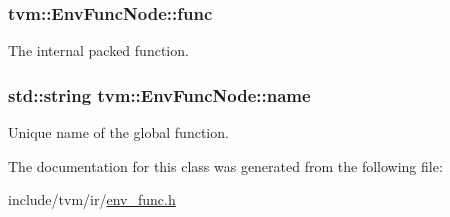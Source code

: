 \subsubsection[{\texorpdfstring{func}{func}}]{ tvm\+::\+Env\+Func\+Node\+::func}\hypertarget{classtvm_1_1EnvFuncNode_a83cd0f272d6f3551630480229b18ff05}{}\label{classtvm_1_1EnvFuncNode_a83cd0f272d6f3551630480229b18ff05}


The internal packed function. 

\subsubsection[{\texorpdfstring{name}{name}}]{\setlength{\rightskip}{0pt plus 5cm}std\+::string tvm\+::\+Env\+Func\+Node\+::name}\hypertarget{classtvm_1_1EnvFuncNode_a03b61a3ac22549e110ef2369686f16ea}{}\label{classtvm_1_1EnvFuncNode_a03b61a3ac22549e110ef2369686f16ea}


Unique name of the global function. 



The documentation for this class was generated from the following file\+:\begin{DoxyCompactItemize}
\item 
include/tvm/ir/\hyperlink{env__func_8h}{env\+\_\+func.\+h}\end{DoxyCompactItemize}
